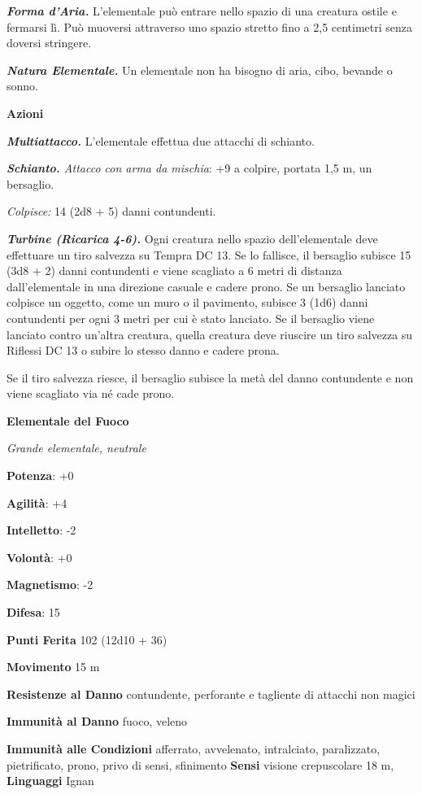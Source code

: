 \begin{multicols}{2}
\emph{\textbf{Forma d'Aria.}} L'elementale può entrare nello spazio di
una creatura ostile e fermarsi lì. Può muoversi attraverso uno spazio
stretto fino a 2,5 centimetri senza doversi stringere.

\emph{\textbf{Natura Elementale.}} Un elementale non ha bisogno di aria,
cibo, bevande o sonno.

\textbf{Azioni}

\emph{\textbf{Multiattacco.}} L'elementale effettua due attacchi di
schianto.

\emph{\textbf{Schianto.} Attacco con arma da mischia}: +9 a colpire,
portata 1,5 m, un bersaglio.

\emph{Colpisce:} 14 (2d8 + 5) danni contundenti.

\emph{\textbf{Turbine (Ricarica 4-6).}} Ogni creatura nello spazio
dell'elementale deve effettuare un tiro salvezza su Tempra DC 13. Se lo
fallisce, il bersaglio subisce 15 (3d8 + 2) danni contundenti e viene
scagliato a 6 metri di distanza dall'elementale in una direzione casuale
e cadere prono. Se un bersaglio lanciato colpisce un oggetto, come un
muro o il pavimento, subisce 3 (1d6) danni contundenti per ogni 3 metri
per cui è stato lanciato. Se il bersaglio viene lanciato contro un'altra
creatura, quella creatura deve riuscire un tiro salvezza su Riflessi DC
13 o subire lo stesso danno e cadere prona.

Se il tiro salvezza riesce, il bersaglio subisce la metà del danno
contundente e non viene scagliato via né cade prono.

\textbf{Elementale del Fuoco}

\emph{Grande elementale, neutrale}

\textbf{Potenza}: +0

\textbf{Agilità}: +4

\textbf{Intelletto}: -2

\textbf{Volontà}: +0

\textbf{Magnetismo}: -2

\textbf{Difesa}: 15

\textbf{Punti Ferita} 102 (12d10 + 36)

\textbf{Movimento} 15 m

\textbf{Resistenze al Danno} contundente, perforante e tagliente di
attacchi non magici

\textbf{Immunità al Danno} fuoco, veleno

\textbf{Immunità alle Condizioni} afferrato, avvelenato, intralciato,
paralizzato, pietrificato, prono, privo di sensi, sfinimento
\textbf{Sensi} visione crepuscolare 18 m, 
\textbf{Linguaggi} Ignan


\end{multicols}
